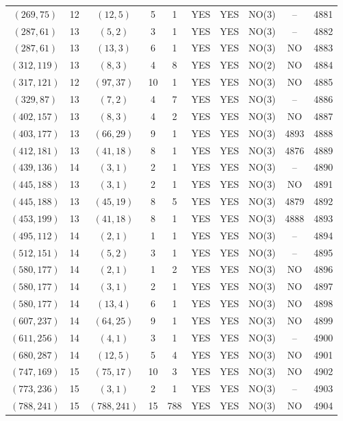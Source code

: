 \begin{longtable}{|c|c|c|c|c|c|c|c|c|c|}
$(269, 75)$ & 12 & $(12, 5)$ & 5 & 1 & YES & YES & NO(3) & -- & 4881\\
$(287, 61)$ & 13 & $(5, 2)$ & 3 & 1 & YES & YES & NO(3) & -- & 4882\\
$(287, 61)$ & 13 & $(13, 3)$ & 6 & 1 & YES & YES & NO(3) & NO & 4883\\
$(312, 119)$ & 13 & $(8, 3)$ & 4 & 8 & YES & YES & NO(2) & NO & 4884\\
$(317, 121)$ & 12 & $(97, 37)$ & 10 & 1 & YES & YES & NO(3) & NO & 4885\\
$(329, 87)$ & 13 & $(7, 2)$ & 4 & 7 & YES & YES & NO(3) & -- & 4886\\
$(402, 157)$ & 13 & $(8, 3)$ & 4 & 2 & YES & YES & NO(3) & NO & 4887\\
$(403, 177)$ & 13 & $(66, 29)$ & 9 & 1 & YES & YES & NO(3) & 4893 & 4888\\
$(412, 181)$ & 13 & $(41, 18)$ & 8 & 1 & YES & YES & NO(3) & 4876 & 4889\\
$(439, 136)$ & 14 & $(3, 1)$ & 2 & 1 & YES & YES & NO(3) & -- & 4890\\
$(445, 188)$ & 13 & $(3, 1)$ & 2 & 1 & YES & YES & NO(3) & NO & 4891\\
$(445, 188)$ & 13 & $(45, 19)$ & 8 & 5 & YES & YES & NO(3) & 4879 & 4892\\
$(453, 199)$ & 13 & $(41, 18)$ & 8 & 1 & YES & YES & NO(3) & 4888 & 4893\\
$(495, 112)$ & 14 & $(2, 1)$ & 1 & 1 & YES & YES & NO(3) & -- & 4894\\
$(512, 151)$ & 14 & $(5, 2)$ & 3 & 1 & YES & YES & NO(3) & -- & 4895\\
$(580, 177)$ & 14 & $(2, 1)$ & 1 & 2 & YES & YES & NO(3) & NO & 4896\\
$(580, 177)$ & 14 & $(3, 1)$ & 2 & 1 & YES & YES & NO(3) & NO & 4897\\
$(580, 177)$ & 14 & $(13, 4)$ & 6 & 1 & YES & YES & NO(3) & NO & 4898\\
$(607, 237)$ & 14 & $(64, 25)$ & 9 & 1 & YES & YES & NO(3) & NO & 4899\\
$(611, 256)$ & 14 & $(4, 1)$ & 3 & 1 & YES & YES & NO(3) & -- & 4900\\
$(680, 287)$ & 14 & $(12, 5)$ & 5 & 4 & YES & YES & NO(3) & NO & 4901\\
$(747, 169)$ & 15 & $(75, 17)$ & 10 & 3 & YES & YES & NO(3) & NO & 4902\\
$(773, 236)$ & 15 & $(3, 1)$ & 2 & 1 & YES & YES & NO(3) & -- & 4903\\
$(788, 241)$ & 15 & $(788, 241)$ & 15 & 788 & YES & YES & NO(3) & NO & 4904\\

\end{longtable}
